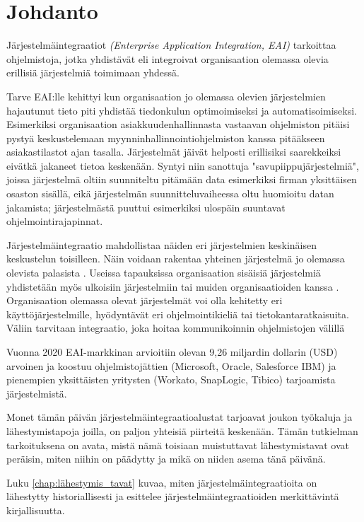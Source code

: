 
\chapter{Johdanto}


Järjestelmäintegraatiot \textit{(Enterprise Application Integration, EAI)} tarkoittaa ohjelmistoja, 
jotka yhdistävät eli integroivat organisaation olemassa olevia erillisiä järjestelmiä toimimaan yhdessä.

Tarve EAI:lle kehittyi kun organisaation jo olemassa olevien
järjestelmien hajautunut tieto piti yhdistää tiedonkulun optimoimiseksi ja
automatisoimiseksi. Esimerkiksi organisaation asiakkuudenhallinnasta vastaavan ohjelmiston
pitäisi pystyä keskustelemaan myynninhallinnointiohjelmiston kanssa pitääkseen
asiakastilastot ajan tasalla. 
Järjestelmät jäivät helposti erillisiksi saarekkeiksi eivätkä jakaneet tietoa keskenään. 
Syntyi niin sanottuja "savupiippujärjestelmiä", joissa järjestelmä oltiin suunniteltu pitämään data esimerkiksi firman yksittäisen osaston sisällä, eikä järjestelmän suunnitteluvaiheessa oltu huomioitu datan jakamista; järjestelmästä puuttui esimerkiksi ulospäin suuntavat ohjelmointirajapinnat. 

Järjestelmäintegraatio mahdollistaa näiden eri järjestelmien keskinäisen keskustelun toisilleen. Näin voidaan rakentaa yhteinen järjestelmä jo olemassa olevista palasista \citep[sivu 15]{linthicum2000enterprise}. Useissa tapauksissa organisaation sisäisiä järjestelmiä yhdistetään myös ulkoisiin järjestelmiin tai muiden organisaatioiden kanssa \citep{Johannesson2001}.
Organisaation olemassa olevat järjestelmät voi olla kehitetty eri käyttöjärjestelmille, hyödyntävät eri
ohjelmointikieliä tai tietokantaratkaisuita. Väliin tarvitaan integraatio, joka hoitaa
kommunikoinnin ohjelmistojen välillä


Vuonna 2020 EAI-markkinan arvioitiin olevan 9,26 miljardin dollarin (USD) arvoinen \citep{mordorintelligence} ja koostuu ohjelmistojättien (Microsoft, Oracle, Salesforce IBM) ja pienempien yksittäisten yritysten (Workato, SnapLogic, Tibico) tarjoamista järjestelmistä.

Monet tämän päivän järjestelmäintegraatioalustat tarjoavat joukon työkaluja ja lähestymistapoja joilla, on paljon yhteisiä piirteitä keskenään. Tämän tutkielman tarkoituksena on avata, mistä nämä toisiaan muistuttavat lähestymistavat ovat peräisin, miten niihin on päädytty ja mikä on niiden asema tänä päivänä.

Luku \ref{chap:lähestymis_tavat} kuvaa, miten järjestelmäintegraatioita on lähestytty historiallisesti ja esittelee järjestelmäintegraatioiden merkittävintä kirjallisuutta.

